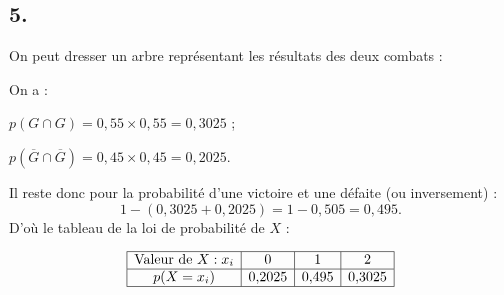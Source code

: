 \documentclass[10pt]{article}
\begin{document}
\subsection*{5.}

On peut dresser un arbre représentant les résultats des deux combats :

\begin{center}
\end{center}

On a :

\( p(G \cap G) = 0{,}55 \times 0{,}55 = 0{,}3025 \) ;

\( p\left(\overline{G} \cap \overline{G}\right) = 0{,}45 \times 0{,}45 = 0{,}2025 \).

Il reste donc pour la probabilité d'une victoire et une défaite (ou inversement) : 
\[
1 - (0{,}3025 + 0{,}2025) = 1 - 0{,}505 = 0{,}495.
\]
D'où le tableau de la loi de probabilité de \( X \) :

\[
\begin{array}{|c|c|c|c|}
\hline
\text{Valeur de } X : x_i & 0 & 1 & 2 \\
\hline
p(X = x_i) & 0{,}2025 & 0{,}495 & 0{,}3025 \\
\hline
\end{array}
\]
\end{document}
